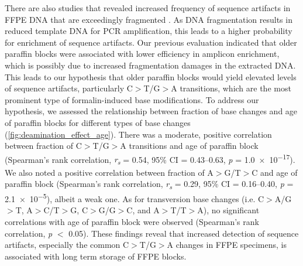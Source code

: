 There are also studies that revealed increased frequency of sequence artifacts in FFPE DNA that are exceedingly fragmented \cite{Carrick2015, Wong2014}. As DNA fragmentation results in reduced template DNA for PCR amplification, this leads to a higher probability for enrichment of sequence artifacts. Our previous evaluation indicated that older paraffin blocks were associated with lower efficiency in amplicon enrichment, which is possibly due to increased fragmentation damages in the extracted DNA. This leads to our hypothesis that older paraffin blocks would yield elevated levels of sequence artifacts, particularly C$>$T/G$>$A transitions, which are the most prominent type of formalin-induced base modifications. To address our hypothesis, we assessed the relationship between fraction of base changes and age of paraffin blocks for different types of base changes (\autoref{fig:deamination_effect_age}). There was a moderate, positive correlation between fraction of C$>$T/G$>$A transitions and age of paraffin block (Spearman's rank correlation, \textit{r\textsubscript{s}} = 0.54, 95\% CI = 0.43--0.63, \textit{p} = \num{1.0e-17}). We also noted a positive correlation between fraction of A$>$G/T$>$C and age of paraffin block (Spearman's rank correlation, \textit{r\textsubscript{s}} = 0.29, 95\% CI = 0.16--0.40, \textit{p} = \num{2.1e-5}), albeit a weak one. As for transversion base changes (i.e. C$>$A/G$>$T, A$>$C/T$>$G, C$>$G/G$>$C, and A$>$T/T$>$A), no significant correlations with age of paraffin block were observed (Spearman's rank correlation, \textit{p} $<$ \num{0.05}). These findings reveal that increased detection of sequence artifacts, especially the common C$>$T/G$>$A changes in FFPE specimens, is associated with long term storage of FFPE blocks.

